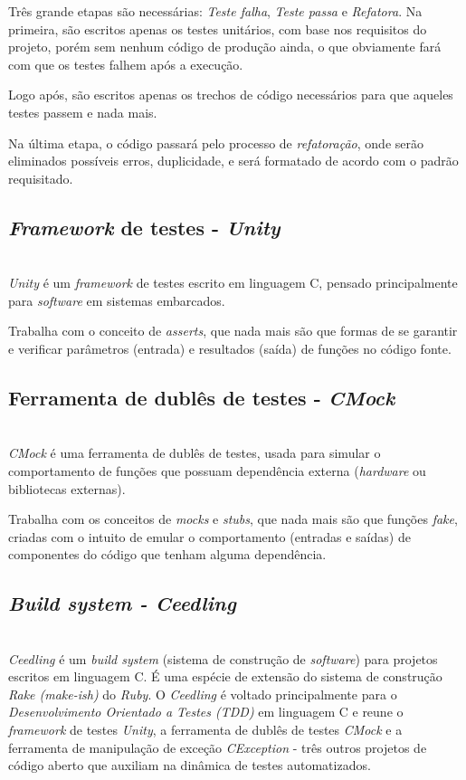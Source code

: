 \documentclass[times, twoside, watermark]{artigo}
\begin{document}
Três grande etapas são necessárias: \textit{Teste falha}, \textit{Teste passa}
e \textit{Refatora}. Na primeira, são escritos apenas os testes unitários, com base 
nos requisitos do projeto, porém sem nenhum código de produção ainda, o que 
obviamente fará com que os testes falhem após a execução.

Logo após, são escritos apenas os trechos de código necessários para que aqueles 
testes passem e nada mais.

Na última etapa, o código passará pelo processo de \textit{refatoração}, onde serão 
eliminados possíveis erros, duplicidade, e será formatado de acordo com o padrão 
requisitado.


\subsection{\textit{Framework} de testes - \textit{Unity}}\hfill\\

\textit{Unity} é um \textit{framework} de testes escrito em linguagem C, pensado 
principalmente para \textit{software} em sistemas embarcados.

Trabalha com o conceito de \textit{asserts}, que nada mais são que formas de se 
garantir e verificar parâmetros (entrada) e resultados (saída) de funções no código 
fonte.


\subsection{Ferramenta de dublês de testes - \textit{CMock}}\hfill\\

\textit{CMock} é uma ferramenta de dublês de testes, usada para simular o 
comportamento de funções que possuam dependência externa (\textit{hardware} ou 
bibliotecas externas).

Trabalha com os conceitos de \textit{mocks} e \textit{stubs}, 
que nada mais são que funções \textit{fake}, criadas com o intuito de emular o 
comportamento (entradas e saídas) de componentes do código que tenham alguma 
dependência. 

\subsection{\textit{Build system - Ceedling}}\hfill\\

\textit{Ceedling} é um \textit{build system} (sistema de construção de 
\textit{software}) para projetos escritos em linguagem C.
É uma espécie de extensão do sistema de construção \textit{Rake (make-ish)} do 
\textit{Ruby}.
O \textit{Ceedling} é voltado principalmente para o 
\textit{Desenvolvimento Orientado a Testes (TDD)} em linguagem C e reune o 
\textit{framework} de testes \textit{Unity}, a ferramenta de dublês de testes 
\textit{CMock} e a ferramenta de manipulação de exceção \textit{CException} - três 
outros projetos de código aberto que auxiliam na dinâmica de testes 
automatizados\cite{gomes2016uttos}.
\end{document}
